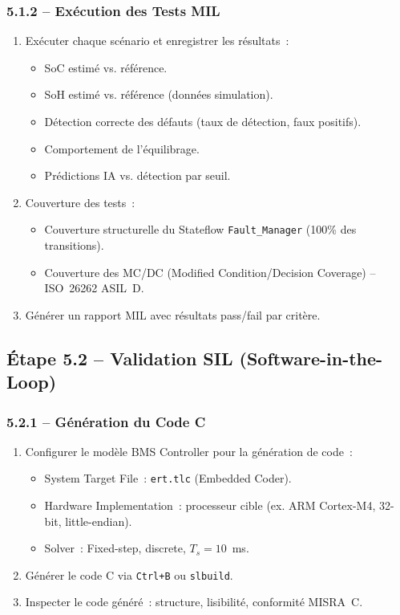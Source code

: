 \documentclass[a4paper,12pt]{article}
\begin{document}
\subsubsection{5.1.2 -- Exécution des Tests MIL}
\begin{enumerate}[nosep]
  \item Exécuter chaque scénario et enregistrer les résultats~:
    \begin{itemize}[nosep]
      \item SoC estimé vs. référence.
      \item SoH estimé vs. référence (données simulation).
      \item Détection correcte des défauts (taux de détection, faux positifs).
      \item Comportement de l'équilibrage.
      \item Prédictions IA vs. détection par seuil.
    \end{itemize}
  \item Couverture des tests~:
    \begin{itemize}[nosep]
      \item Couverture structurelle du Stateflow \texttt{Fault\_Manager} (100\% des transitions).
      \item Couverture des MC/DC (Modified Condition/Decision Coverage) -- ISO~26262 ASIL~D.
    \end{itemize}
  \item Générer un rapport MIL avec résultats pass/fail par critère.
\end{enumerate}

\subsection{Étape 5.2 -- Validation SIL (Software-in-the-Loop)}

\subsubsection{5.2.1 -- Génération du Code C}
\begin{enumerate}[nosep]
  \item Configurer le modèle BMS Controller pour la génération de code~:
    \begin{itemize}[nosep]
      \item System Target File~: \texttt{ert.tlc} (Embedded Coder).
      \item Hardware Implementation~: processeur cible (ex. ARM Cortex-M4, 32-bit, little-endian).
      \item Solver~: Fixed-step, discrete, $T_s = 10$~ms.
    \end{itemize}
  \item Générer le code C via \texttt{Ctrl+B} ou \texttt{slbuild}.
  \item Inspecter le code généré~: structure, lisibilité, conformité MISRA~C.
\end{enumerate}
\end{document}
